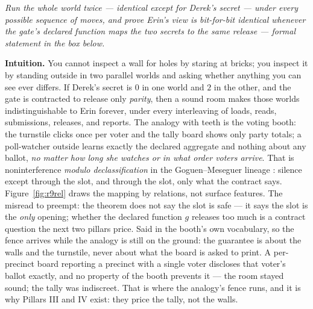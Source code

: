 \documentclass[11pt,a4paper]{article}
\newcommand{\onebreath}[1]{\begin{center}\emph{#1}\end{center}}
\begin{document}
\onebreath{Run the whole world twice --- identical except for Derek's secret --- under every
possible sequence of moves, and prove Erin's view is bit-for-bit identical whenever the gate's declared function maps the two
secrets to the same release --- formal statement in the box below.}

\textbf{Intuition.} You cannot inspect a wall for holes by staring at bricks; you inspect it by standing outside in two parallel
worlds and asking whether anything you can see ever differs. If Derek's secret is $0$ in one world and $2$ in the other, and the
gate is contracted to release only \emph{parity}, then a sound room makes those worlds indistinguishable to Erin forever, under
every interleaving of loads, reads, submissions, releases, and reports. The analogy with teeth is the voting booth: the turnstile
clicks once per voter and the tally board shows only party totals; a poll-watcher outside learns exactly the declared aggregate
and nothing about any ballot, \emph{no matter how long she watches or in what order voters arrive}. That is noninterference
\emph{modulo declassification} in the Goguen--Meseguer lineage \cite{goguen-meseguer-82,goguen-meseguer-84}: silence except
through the slot, and through the slot, only what the contract says. Figure~\ref{fig:r9rel} draws the mapping by relations, not
surface features. The misread to preempt: the theorem does not say the slot is safe --- it says the slot is the \emph{only}
opening; whether the declared function $g$ releases too much is a contract question the next two pillars price. Said in the
booth's own vocabulary, so the fence arrives while the analogy is still on the ground: the guarantee is about the walls and the
turnstile, never about what the board is asked to print. A per-precinct board reporting a precinct with a single voter discloses
that voter's ballot exactly, and no property of the booth prevents it --- the room stayed sound; the tally was indiscreet. That is
where the analogy's fence runs, and it is why Pillars III and IV exist: they price the tally, not the walls.


\end{document}

